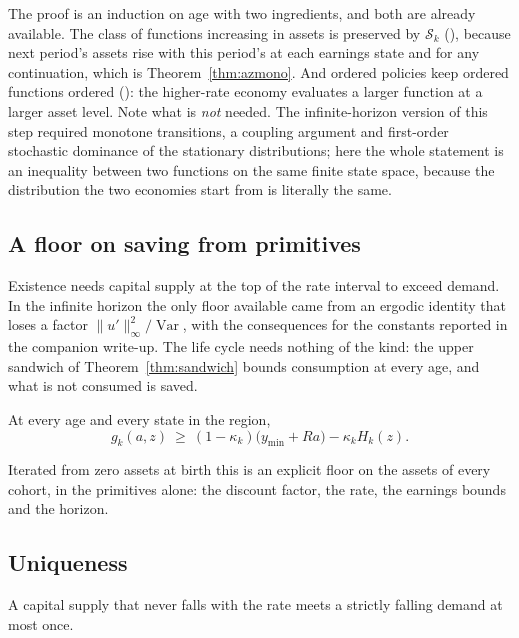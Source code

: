 The proof is an induction on age with two ingredients, and both are already available. The class
of functions increasing in assets is preserved by $\mathcal{S}_k$
(), because next period's assets rise with this period's at each
earnings state and for any continuation, which is Theorem~\ref{thm:azmono}. And ordered policies
keep ordered functions ordered (): the higher-rate economy
evaluates a larger function at a larger asset level. Note what is \emph{not} needed. The
infinite-horizon version of this step required monotone transitions, a coupling argument and
first-order stochastic dominance of the stationary distributions; here the whole statement is an
inequality between two functions on the same finite state space, because the distribution the two
economies start from is literally the same.

\subsection{A floor on saving from primitives}

Existence needs capital supply at the top of the rate interval to exceed demand. In the infinite
horizon the only floor available came from an ergodic identity that loses a factor
$\|u'\|_\infty^2/\operatorname{Var}$, with the consequences for the constants reported in the
companion write-up. The life cycle needs nothing of the kind: the upper sandwich of
Theorem~\ref{thm:sandwich} bounds consumption at every age, and what is not consumed is saved.

\begin{proposition}\label{prop:floor}
At every age and every state in the region,
\[
  g_k(a,z)\ \ge\ (1-\kappa_k)\bigl(y_{\min}+Ra\bigr)-\kappa_k H_k(z).
\]
\end{proposition}

Iterated from zero assets at birth this is an explicit floor on the assets of every cohort, in
the primitives alone: the discount factor, the rate, the earnings bounds and the horizon.

\subsection{Uniqueness}

\begin{theorem}\label{thm:thm3}
A capital supply that never falls with the rate meets a strictly falling demand at most once.
\end{theorem}

